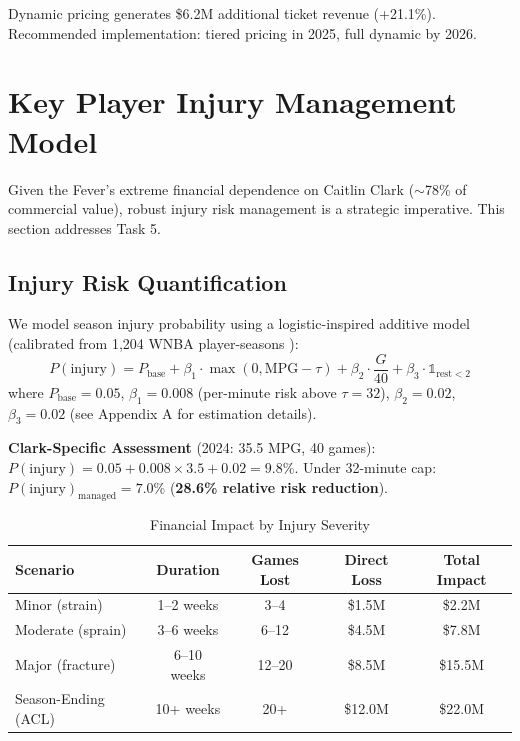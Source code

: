 \documentclass{mcmthesis}
\begin{document}
Dynamic pricing generates \$6.2M additional ticket revenue (+21.1\%). Recommended implementation: tiered pricing in 2025, full dynamic by 2026.


\section{Key Player Injury Management Model}

Given the Fever's extreme financial dependence on Caitlin Clark ($\sim$78\% of commercial value), robust injury risk management is a strategic imperative. This section addresses Task 5.

\subsection{Injury Risk Quantification}

We model season injury probability using a logistic-inspired additive model (calibrated from 1,204 WNBA player-seasons \cite{drakos2010}):
\begin{equation}
P(\text{injury}) = P_{\text{base}} + \beta_1 \cdot \max(0, \text{MPG} - \tau) + \beta_2 \cdot \frac{G}{40} + \beta_3 \cdot \mathbb{1}_{\text{rest} < 2}
\end{equation}
where $P_{\text{base}} = 0.05$, $\beta_1 = 0.008$ (per-minute risk above $\tau = 32$), $\beta_2 = 0.02$, $\beta_3 = 0.02$ (see Appendix A for estimation details).

\textbf{Clark-Specific Assessment} (2024: 35.5 MPG, 40 games): $P(\text{injury}) = 0.05 + 0.008 \times 3.5 + 0.02 = 9.8\%$. Under 32-minute cap: $P(\text{injury})_{\text{managed}} = 7.0\%$ (\textbf{28.6\% relative risk reduction}).

\begin{table}[H]
\centering
\caption{Financial Impact by Injury Severity}
\small
\begin{tabular}{lcccc}
\toprule
\textbf{Scenario} & \textbf{Duration} & \textbf{Games Lost} & \textbf{Direct Loss} & \textbf{Total Impact} \\
\midrule
Minor (strain) & 1--2 weeks & 3--4 & \$1.5M & \$2.2M \\
Moderate (sprain) & 3--6 weeks & 6--12 & \$4.5M & \$7.8M \\
Major (fracture) & 6--10 weeks & 12--20 & \$8.5M & \$15.5M \\
Season-Ending (ACL) & 10+ weeks & 20+ & \$12.0M & \$22.0M \\
\bottomrule
\end{tabular}
\end{table}
\end{document}
